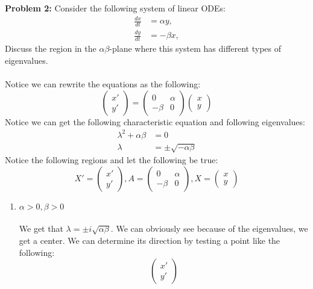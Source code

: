 \documentclass[11pt]{article}
\newenvironment{problem}[1]{\textbf{Problem #1: }}{\newpage}
\begin{document}
	\begin{problem}{2}
		Consider the following system of linear ODEs:
		\begin{align*}
			\frac{dx}{dt} &= \alpha y, \tag{2a} \\
			\frac{dy}{dt} &= - \beta x, \tag{2b}
		\end{align*}
		Discuss the region in the $\alpha\beta$-plane where this system has different types of eigenvalues.
		\\ \\
		Notice we can rewrite the equations as the following:
		\[
		\begin{pmatrix}
			x' \\
			y'
		\end{pmatrix} = 
		\begin{pmatrix}
			0 & \alpha \\
			-\beta & 0 
		\end{pmatrix}
		\begin{pmatrix}
			x \\
			y
		\end{pmatrix}
		\]
		Notice we can get the following characteristic equation and following eigenvalues:
		\begin{align*}
			\lambda^2 + \alpha\beta &= 0 \\
			\lambda &= \pm \sqrt{-\alpha\beta}
		\end{align*}
		Notice the following regions and let the following be true: 
		\[X'= \begin{pmatrix}
			x' \\ y'
		\end{pmatrix}, A = \begin{pmatrix}
		0 & \alpha \\
		-\beta & 0 
		\end{pmatrix}, X = \begin{pmatrix}
			x \\ y
		\end{pmatrix}\]
		\newpage
		\begin{enumerate}[label = (\roman*)]
			\item \boldmath $\alpha > 0, \beta > 0$ \unboldmath
			\\ \\
			We get that $\lambda = \pm i \sqrt{\alpha\beta}$. 
			We can obviously see because of the eigenvalues, we get a center.  We can determine its direction by testing a point like the following:
			\[\begin{pmatrix}
				x' \\ y' 

\end{pmatrix}\]
\end{enumerate}
\end{problem}
\end{document}
